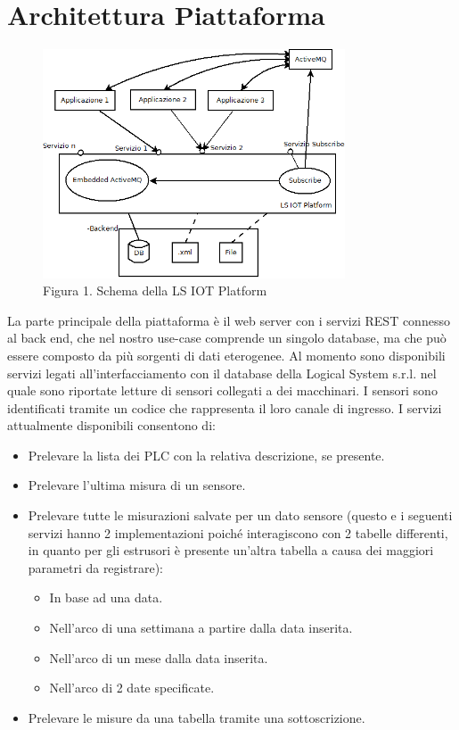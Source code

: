 \section{Architettura Piattaforma}
\begin{figure}[h]
	\centering
	\includegraphics[width=0.8\textwidth]{architettura-piattaforma.png}
	\caption*{Figura 1. Schema della LS IOT Platform}
\end{figure}
La parte principale della piattaforma è il web server con i servizi REST connesso al back end, che nel nostro use-case comprende un singolo database, ma che può essere composto da più sorgenti di dati eterogenee.
Al momento sono disponibili servizi legati all’interfacciamento con il database della Logical System s.r.l. nel quale sono riportate letture di sensori collegati a dei macchinari. I sensori sono identificati tramite un codice che rappresenta il loro canale di ingresso.
I servizi attualmente disponibili consentono di:
\begin{itemize}
	\item Prelevare la lista dei PLC con la relativa descrizione, se presente.
	\item Prelevare l’ultima misura di un sensore.
	\item Prelevare tutte le misurazioni salvate per un dato sensore (questo e i seguenti servizi hanno 2 implementazioni poiché interagiscono con 2 tabelle differenti, in quanto per gli estrusori è presente un’altra tabella a causa dei maggiori parametri da registrare): \begin{itemize}
		\item In base ad una data.
		\item Nell’arco di una settimana a partire dalla data inserita.
		\item Nell’arco di un mese dalla data inserita.
		\item Nell’arco di 2 date specificate.	
	\end{itemize}
	\item Prelevare le misure da una tabella tramite una sottoscrizione.
\end{itemize}

